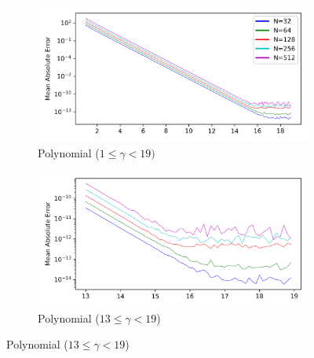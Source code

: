 \documentclass[a4paper]{report}
\begin{document}
\begin{figure}[H]
    \begin{subfigure}{.45\linewidth}
      \includegraphics[width=\linewidth]{images/cavers/polynomial.png}
      \caption{Polynomial ($1 \leq \gamma < 19)$}
    \end{subfigure}\hfill
    \begin{subfigure}{.45\linewidth}
      \includegraphics[width=\linewidth]{images/cavers/polynomial_zoomed.png}
      \caption{Polynomial ($13 \leq \gamma < 19$)}
    \end{subfigure}
    
    \medskip
    

\end{figure}
\end{document}

